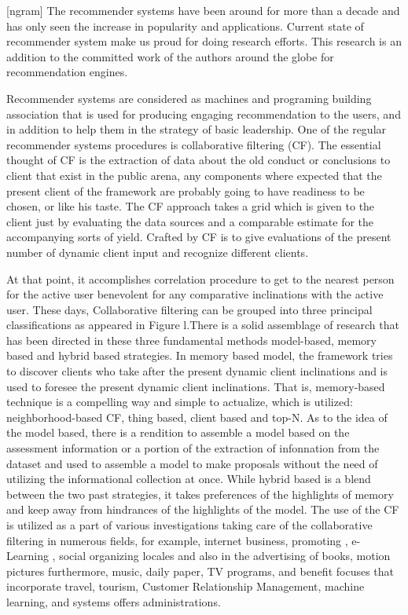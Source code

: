 \documentclass[10pt,conference]{IEEEtran}
\begin{document}
[ngram]
The recommender systems have been around for more than a decade and has only seen the increase in popularity and applications.
Current state of recommender system make us proud for doing research efforts. This research is an addition to the committed work of the authors around the globe for recommendation engines.

Recommender systems are considered as machines and programing building association that is used for producing engaging recommendation to the users, and in addition to help them in the strategy of basic leadership. One of the regular recommender systems procedures is collaborative filtering (CF). The essential thought of CF is the extraction of data about the old conduct or conclusions to client that exist in the public arena, any components where expected that the present client of the framework are probably going to have readiness to be chosen, or like his taste. The CF approach takes a grid which is given to the client just by evaluating the data sources and a comparable estimate for the accompanying sorts of yield. Crafted by CF is to give evaluations of the present number of dynamic client input and recognize different clients.

At that point, it accomplishes correlation procedure to get to the nearest person for the active user benevolent for any comparative inclinations with the active user. These days, Collaborative filtering can be grouped into three principal classifications as appeared in Figure l.There is a solid assemblage of research that has been directed in these three fundamental methods model-based, memory based and hybrid based strategies. In memory based model, the framework tries to discover clients who take after the present dynamic client inclinations and is used to foresee the present dynamic client inclinations. That is, memory-based technique is a compelling way and simple to actualize, which is utilized: neighborhood-based CF, thing based, client based and top-N. As to the idea of the model based, there is a rendition to assemble a model based on the assessment information or a portion of the extraction of infonnation from the dataset and used to assemble a model to make proposals without the need of utilizing the informational collection at once. While hybrid based is a blend between the two past strategies, it takes preferences of the highlights of memory and keep away from hindrances of the highlights of the model. The use of the CF is utilized as a part of various investigations taking care of the collaborative filtering in numerous fields, for example, internet business, promoting , e-Learning , social organizing locales and also in the advertising of books, motion pictures furthermore, music, daily paper, TV programs, and benefit focuses that incorporate travel, tourism, Customer Relationship Management, machine learning, and systems offers administrations.
\end{document}
